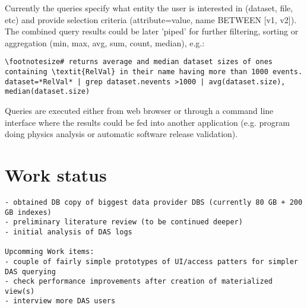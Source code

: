 \documentclass[a4paper,11pt,draft]{article}
\begin{document}
Currently the queries specify what entity the user is interested in (dataset, file, etc) and provide selection criteria (attribute=value, name BETWEEN [v1, v2]). The combined query results could be later 'piped' for further filtering, sorting or aggregation (min, max, avg, sum, count, median), e.g.:

{\small 
\begin{Verbatim}[commandchars=\\\{\}]
\footnotesize# returns average and median dataset sizes of ones containing \textit{RelVal} in their name having more than 1000 events.
dataset=*RelVal* | grep dataset.nevents >1000 | avg(dataset.size), median(dataset.size)
\end{Verbatim}
}

Queries are executed either from web browser or through a command line interface where the results could be fed into another application (e.g. program doing physics analysis or automatic software release validation).







\section{Work status}
{\color{red}
\begin{verbatim}
- obtained DB copy of biggest data provider DBS (currently 80 GB + 200 GB indexes)
- preliminary literature review (to be continued deeper)
- initial analysis of DAS logs

Upcomming Work items:
- couple of fairly simple prototypes of UI/access patters for simpler DAS querying
- check performance improvements after creation of materialized view(s)
- interview more DAS users
\end{verbatim}
}


\thispagestyle{empty}
\begin{small}

\end{small}

\pagebreak

\end{document}
